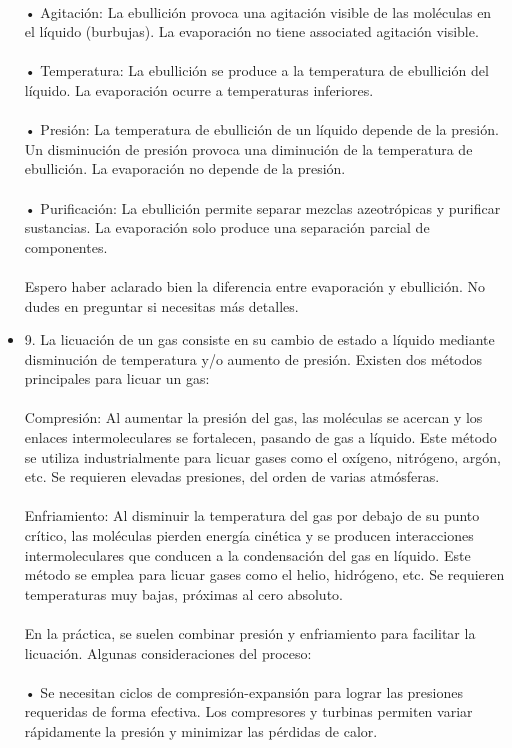 \documentclass{article}
\begin{document}
\begin{itemize}
\\
• Agitación: La ebullición provoca una agitación visible de las moléculas en el líquido (burbujas). La evaporación no tiene associated agitación visible.\\
\\
• Temperatura: La ebullición se produce a la temperatura de ebullición del líquido. La evaporación ocurre a temperaturas inferiores.\\
\\
• Presión: La temperatura de ebullición de un líquido depende de la presión. Un disminución de presión provoca una diminución de la temperatura de ebullición. La evaporación no depende de la presión.\\
\\
• Purificación: La ebullición permite separar mezclas azeotrópicas y purificar sustancias. La evaporación solo produce una separación parcial de componentes.\\
\\
Espero haber aclarado bien la diferencia entre evaporación y ebullición. No dudes en preguntar si necesitas más detalles.\\
\item{9.}
La licuación de un gas consiste en su cambio de estado a líquido mediante disminución de temperatura y/o aumento de presión. Existen dos métodos principales para licuar un gas:\\
\\
Compresión: Al aumentar la presión del gas, las moléculas se acercan y los enlaces intermoleculares se fortalecen, pasando de gas a líquido. Este método se utiliza industrialmente para licuar gases como el oxígeno, nitrógeno, argón, etc. Se requieren elevadas presiones, del orden de varias atmósferas.\\
\\
Enfriamiento: Al disminuir la temperatura del gas por debajo de su punto crítico, las moléculas pierden energía cinética y se producen interacciones intermoleculares que conducen a la condensación del gas en líquido. Este método se emplea para licuar gases como el helio, hidrógeno, etc. Se requieren temperaturas muy bajas, próximas al cero absoluto.\\
\\
En la práctica, se suelen combinar presión y enfriamiento para facilitar la licuación. Algunas consideraciones del proceso:\\
\\
• Se necesitan ciclos de compresión-expansión para lograr las presiones requeridas de forma efectiva. Los compresores y turbinas permiten variar rápidamente la presión y minimizar las pérdidas de calor.\\

\end{itemize}
\end{document}
